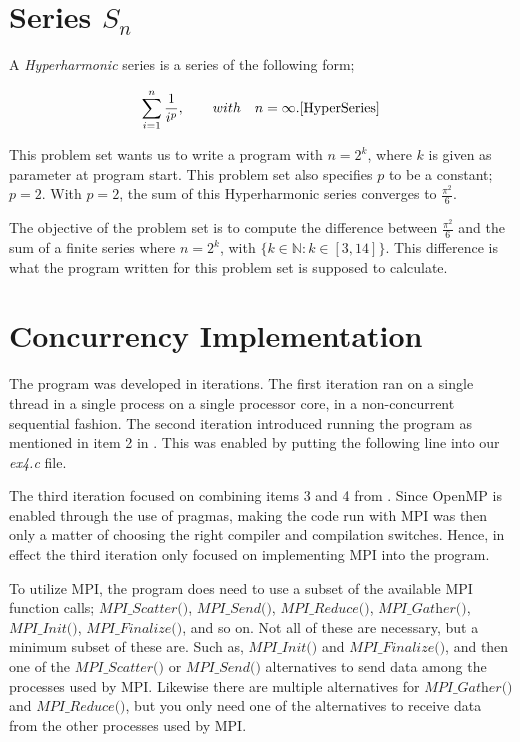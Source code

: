 \documentclass[fontsize=11pt,paper=a4,titlepage]{report}
\begin{document}
\section{Series $S_n$}

A \textit{Hyperharmonic} series is a series of the following form;

\begin{displaymath}
	\sum_{i=1}^{n} \frac{1}{i^p}, \quad \quad with \quad n = \infty.
	\ref{HyperSeries}
\end{displaymath}

This problem set wants us to write a program with $n = 2^k$, where $k$ is given
as parameter at program start. This
problem set also specifies $p$ to be a constant; $p = 2$. With $p = 2$, the sum
of this Hyperharmonic series converges to $\frac{\pi^2}{6}$.

The objective of the problem set is to compute the difference between
$\frac{\pi^2}{6}$ and the sum of a finite series where $n = 2^k$, with $\{k \in
\mathbb{N} : k \in [3, 14]\}$. This difference is what the program written for
this problem set is supposed to calculate.

\section{Concurrency Implementation}

The program was developed in iterations. The first iteration ran on a single
thread in a single process on a single processor core, in a non-concurrent
sequential fashion. The second iteration introduced running the program as
mentioned in item 2 in \cite{RunMode}. This was enabled by putting the following
line into our \textit{ex4.c} file.


The third iteration focused on combining items 3 and 4 from \cite{RunMode}.
Since OpenMP is enabled through the use of pragmas, making the code run with MPI
was then only a matter of choosing the right compiler and compilation switches.
Hence, in effect the third iteration only focused on implementing MPI into the
program.

To utilize MPI, the program does need to use a subset of the available MPI
function calls; $\textit{MPI\_Scatter()}$, $\textit{MPI\_Send()}$,
$\textit{MPI\_Reduce()}$, $\textit{MPI\_Gather()}$, $\textit{MPI\_Init()}$,
$\textit{MPI\_Finalize()}$, and so on. Not all of these are necessary, but a
minimum subset of these are. Such as, $\textit{MPI\_Init()}$ and $\textit{
MPI\_Finalize()}$, and then one of the $\textit{MPI\_Scatter()}$ or
$\textit{MPI\_Send()}$ alternatives to send data among the processes used by MPI. Likewise there are multiple alternatives
for $\textit{MPI\_Gather()}$ and $\textit{MPI\_Reduce()}$, but you only need
one of the alternatives to receive data from the other processes used by MPI.
\end{document}
